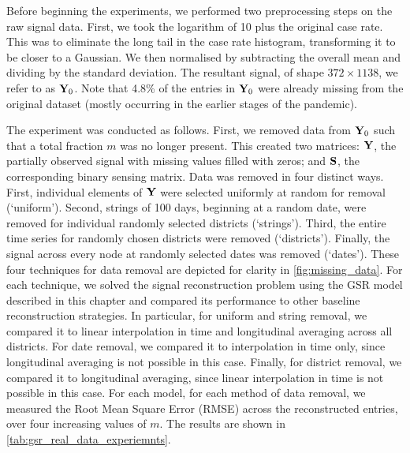 Before beginning the experiments, we performed two preprocessing steps on the raw signal data. First, we took the logarithm of 10 plus the original case rate. This was to eliminate the long tail in the case rate histogram, transforming it to be closer to a Gaussian. We then normalised by subtracting the overall mean and dividing by the standard deviation. The resultant signal, of shape $372 \times 1138$, we refer to as $\mathbf{Y}_0$. Note that 4.8\% of the entries in $\mathbf{Y}_0$ were already missing from the original dataset (mostly occurring in the earlier stages of the pandemic).

The experiment was conducted as follows. First, we removed data from $\mathbf{Y}_0$ such that a total fraction $m$ was no longer present. This created two matrices: $\mathbf{Y}$, the partially observed signal with missing values filled with zeros; and $\mathbf{S}$, the corresponding binary sensing matrix. Data was removed in four distinct ways. First, individual elements of $\mathbf{Y}$ were selected uniformly at random for removal (`uniform'). Second, strings of 100 days, beginning at a random date, were removed for individual randomly selected districts (`strings'). Third, the entire time series for randomly chosen districts were removed (`districts'). Finally, the signal across every node at randomly selected dates was removed (`dates'). These four techniques for data removal are depicted for clarity in \cref{fig:missing_data}. For each technique, we solved the signal reconstruction problem using the GSR model described in this chapter and compared its performance to other baseline reconstruction strategies. In particular, for uniform and string removal, we compared it to linear interpolation in time and longitudinal averaging across all districts. For date removal, we compared it to interpolation in time only, since longitudinal averaging is not possible in this case. Finally, for district removal, we compared it to longitudinal averaging, since linear interpolation in time is not possible in this case. For each model, for each method of data removal, we measured the Root Mean Square Error (RMSE) across the reconstructed entries, over four increasing values of $m$. The results are shown in \cref{tab:gsr_real_data_experiemnts}. 



